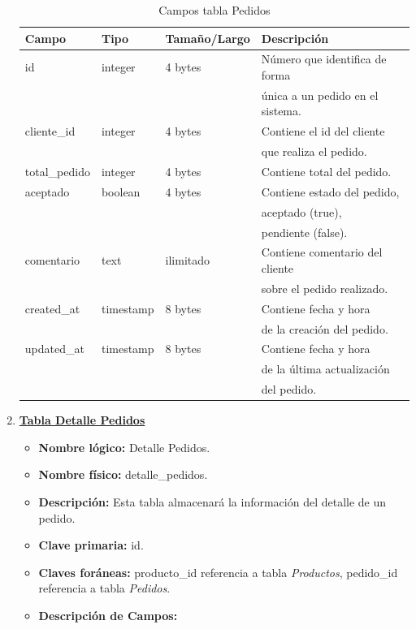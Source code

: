 \documentclass[letterpaper,12pt]{article}
\begin{document}
\begin{enumerate}
\begin{table}[!ht]
\caption{Campos tabla Pedidos} 
\begin{center}
\begin{tabular}{|l|l|l|l|}
\hline
\textbf{Campo} \hspace*{2cm} & \textbf{Tipo} & \textbf{Tamaño/Largo} & \textbf{Descripción} \hspace*{3,5cm} \\
\hline
id & integer & 4 bytes&Número que identifica de forma\\ 
\mbox{} & \mbox{} & &única a un pedido en el sistema.\\
\hline

cliente\_id & integer & 4 bytes&Contiene el id del cliente \\
\mbox{} & \mbox{} & &que realiza el pedido.\\
\hline

total\_pedido & integer & 4 bytes&Contiene total del pedido.\\
\hline

aceptado & boolean & 4 bytes &Contiene estado del pedido,\\
\mbox{} & \mbox{} & &aceptado (true), \\
\mbox{} & \mbox{} & &pendiente (false). \\
\hline

comentario & text & ilimitado &Contiene comentario del cliente \\
\mbox{} & \mbox{} & &sobre el pedido realizado.\\
\hline
created\_at& timestamp & 8 bytes &Contiene fecha y hora\\
\mbox{} & \mbox{} & &de la creación del pedido.\\
\hline
updated\_at& timestamp & 8 bytes &Contiene fecha y hora\\
\mbox{} & \mbox{} & &de la última actualización\\
\mbox{} & \mbox{} & &del pedido.\\
\hline

\end{tabular}
\end{center}
\end{table}

\newpage

\item \textbf{\underline{Tabla Detalle Pedidos}}
\begin{itemize}
\item \textbf{Nombre lógico:} Detalle Pedidos.
\item \textbf{Nombre físico:} detalle\_pedidos.
\item \textbf{Descripción:} Esta tabla almacenará la información del detalle de un pedido.
\item \textbf{Clave primaria:} id.
\item \textbf{Claves foráneas:} producto\_id referencia a tabla \emph{Productos}, pedido\_id referencia a tabla \emph{Pedidos}.
\item\textbf{Descripción de Campos:}
\end{itemize}


\end{enumerate}
\end{document}

